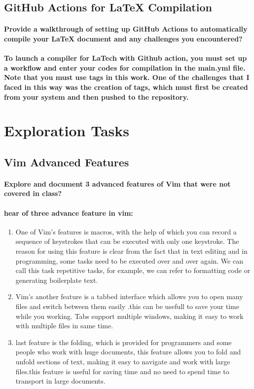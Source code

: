 \documentclass[12pt]{article}
\begin{document}
\subsection{GitHub Actions for LaTeX Compilation}
\paragraph{Provide a walkthrough of setting up GitHub Actions to automatically compile your LaTeX
document and any challenges you encountered?}
\paragraph{To launch a compiler for LaTech with Github action, you must set up a workflow and enter your codes for compilation in the main.yml file.\\ Note that you must use tags in this work.
One of the challenges that I faced in this way was the creation of tags, which must first be created from your system and then pushed to the repository.}
\section{Exploration Tasks}
\subsection{Vim Advanced Features}
\paragraph{Explore and document 3 advanced features of Vim that were not covered in class?}
\paragraph{hear of three advance feature in vim:}

\begin{enumerate}
    \item One of Vim's features is macros, with the help of which you can record a sequence of keystrokes that can be executed with only one keystroke. The reason for using this feature is clear from the fact that in text editing and in programming, some tasks need to be executed over and over again. We can call this task repetitive tasks, for example, we can refer to formatting code or generating boilerplate text.
    \item Vim's another feature is a tabbed interface which allows you to open many files and switch between them easily .this can be usefull to save your time while you working. Tabs support multiple windows, making it easy to work with multiple files in same time.
    \item last feature is the folding, which is provided for programmers and some people who work with huge documents, this feature allows you to fold and unfold sections of text, making it easy to navigate and work with large files.this feature is useful for saving time and no need to spend time to transport in large documents.
\end{enumerate}
\end{document}
